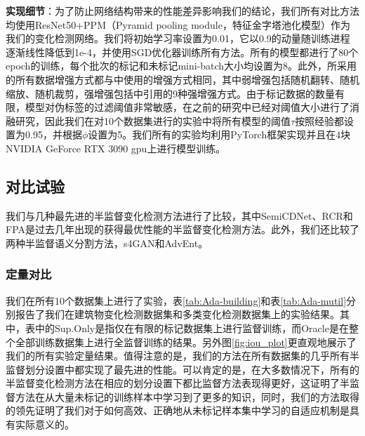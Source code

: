 \documentclass[lang=chs, degree=master, blindreview=false, adobe=false]{yanputhesis}
\begin{document}
\textbf{实现细节}：为了防止网络结构带来的性能差异影响我们的结论，我们所有对比方法均使用ResNet50+PPM（Pyramid pooling module，特征金字塔池化模型）作为我们的变化检测网络。我们将初始学习率设置为0.01，它以0.9的动量随训练进程逐渐线性降低到1e-4，并使用SGD优化器训练所有方法。所有的模型都进行了80个epoch的训练，每个批次的标记和未标记mini-batch大小均设置为8。此外，所采用的所有数据增强方式都与\cite{Zhang2023FPA}中使用的增强方式相同，其中弱增强包括随机翻转、随机缩放、随机裁剪，强增强包括\cite{cubuk2020randaugment}中引用的9种强增强方式。由于标记数据的数量有限，模型对伪标签的过滤阈值非常敏感，在之前的研究中\cite{Zhang2023FPA}已经对阈值大小进行了消融研究，因此我们在对10个数据集进行的实验中将所有模型的阈值$\tau$按照经验都设置为0.95，并根据\cite{bandara2022RCR}$\phi$设置为5。我们所有的实验均利用PyTorch框架实现并且在4块NVIDIA GeForce RTX 3090 gpu上进行模型训练。
\subsection{对比试验}
我们与几种最先进的半监督变化检测方法进行了比较，其中SemiCDNet\cite{peng2021SemiCDNet}、RCR\cite{bandara2022RCR}和FPA\cite{Zhang2023FPA}是过去几年出现的获得最优性能的半监督变化检测方法。此外，我们还比较了两种半监督语义分割方法，s4GAN\cite{mittal2019semi}和AdvEnt\cite{vu2019advent}。
\subsubsection{定量对比}
我们在所有10个数据集上进行了实验，表\ref{tab:Ada-building}和表\ref{tab:Ada-mutil}分别报告了我们在建筑物变化检测数据集和多类变化检测数据集上的实验结果。其中，表中的Sup.Only是指仅在有限的标记数据集上进行监督训练，而Oracle是在整个全部训练数据集上进行全监督训练的结果。另外图\ref{fig:iou_plot}更直观地展示了我们的所有实验定量结果。值得注意的是，我们的方法在所有数据集的几乎所有半监督划分设置中都实现了最先进的性能。可以肯定的是，在大多数情况下，所有的半监督变化检测方法在相应的划分设置下都比监督方法表现得更好，这证明了半监督方法在从大量未标记的训练样本中学习到了更多的知识，同时，我们的方法取得的领先证明了我们对于如何高效、正确地从未标记样本集中学习的自适应机制是具有实际意义的。
\end{document}
